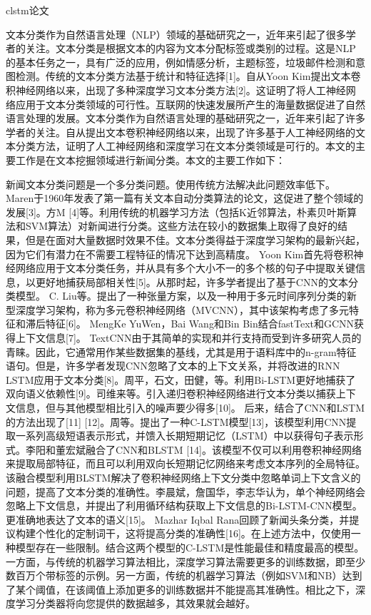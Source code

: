 clstm论文

文本分类作为自然语言处理（NLP）领域的基础研究之一，近年来引起了很多学者的关注。文本分类是根据文本的内容为文本分配标签或类别的过程。这是NLP的基本任务之一，具有广泛的应用，例如情感分析，主题标签，垃圾邮件检测和意图检测。传统的文本分类方法基于统计和特征选择[1]。自从Yoon Kim提出文本卷积神经网络以来，出现了多种深度学习文本分类方法[2]。这证明了将人工神经网络应用于文本分类领域的可行性。互联网的快速发展所产生的海量数据促进了自然语言处理的发展。文本分类作为自然语言处理的基础研究之一，近年来引起了许多学者的关注。自从提出文本卷积神经网络以来，出现了许多基于人工神经网络的文本分类方法，证明了人工神经网络和深度学习在文本分类领域是可行的。本文的主要工作是在文本挖掘领域进行新闻分类。本文的主要工作如下：

新闻文本分类问题是一个多分类问题。使用传统方法解决此问题效率低下。 Maren于1960年发表了第一篇有关文本自动分类算法的论文，这促进了整个领域的发展[3]。方M [4]等。利用传统的机器学习方法（包括K近邻算法，朴素贝叶斯算法和SVM算法）对新闻进行分类。这些方法在较小的数据集上取得了良好的结果，但是在面对大量数据时效果不佳。文本分类得益于深度学习架构的最新兴起，因为它们有潜力在不需要工程特征的情况下达到高精度。 Yoon Kim首先将卷积神经网络应用于文本分类任务，并从具有多个大小不一的多个核的句子中提取关键信息，以更好地捕获局部相关性[5]。从那时起，许多学者提出了基于CNN的文本分类模型。 C. Liu等。提出了一种张量方案，以及一种用于多元时间序列分类的新型深度学习架构，称为多元卷积神经网络（MVCNN），其中该架构考虑了多元特征和滞后特征[6]。 MengKe YuWen，Bai Wang和Bin Bin结合fastText和GCNN获得上下文信息[7]。 TextCNN由于其简单的实现和并行支持而受到许多研究人员的青睐。因此，它通常用作某些数据集的基线，尤其是用于语料库中的n-gram特征语句。但是，许多学者发现CNN忽略了文本的上下文关系，并将改进的RNN LSTM应用于文本分类[8]。周平，石文，田健，等。利用Bi-LSTM更好地捕获了双向语义依赖性[9]。司维来等。引入递归卷积神经网络进行文本分类以捕获上下文信息，但与其他模型相比引入的噪声要少得多[10]。
后来，结合了CNN和LSTM的方法出现了[11] [12]。周等。提出了一种C-LSTM模型[13]，该模型利用CNN提取一系列高级短语表示形式，并馈入长期短期记忆（LSTM）中以获得句子表示形式。李阳和董宏斌融合了CNN和BLSTM [14]。该模型不仅可以利用卷积神经网络来提取局部特征，而且可以利用双向长短期记忆网络来考虑文本序列的全局特征。该融合模型利用BLSTM解决了卷积神经网络上下文分类中忽略单词上下文含义的问题，提高了文本分类的准确性。李晨斌，詹国华，李志华认为，单个神经网络会忽略上下文信息，并提出了利用循环结构获取上下文信息的Bi-LSTM-CNN模型。更准确地表达了文本的语义[15]。 Mazhar Iqbal Rana回顾了新闻头条分类，并提议构建个性化的定制词干，这将提高分类的准确性[16]。在上述方法中，仅使用一种模型存在一些限制。结合这两个模型的C-LSTM是性能最佳和精度最高的模型。一方面，与传统的机器学习算法相比，深度学习算法需要更多的训练数据，即至少数百万个带标签的示例。另一方面，传统的机器学习算法（例如SVM和NB）达到了某个阈值，在该阈值上添加更多的训练数据并不能提高其准确性。相比之下，深度学习分类器将向您提供的数据越多，其效果就会越好。